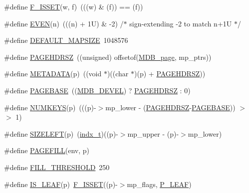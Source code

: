 \begin{DoxyCompactItemize}
\#define \mbox{\hyperlink{group__internal_gaa5b968981dd75e8bf30b40b9bf7bc4b8}{F\+\_\+\+I\+S\+S\+ET}}(w,  f)~(((w) \& (f)) == (f))
\item 
\#define \mbox{\hyperlink{group__internal_gaa714d529ede8765c6f6fffe5293b3bd4}{E\+V\+EN}}(n)~(((n) + 1\+U) \& -\/2) /$\ast$ sign-\/extending -\/2 to match n+1\+U $\ast$/
\item 
\#define \mbox{\hyperlink{group__internal_ga506f893519db205966f7988c03c920f5}{D\+E\+F\+A\+U\+L\+T\+\_\+\+M\+A\+P\+S\+I\+ZE}}~1048576
\item 
\#define \mbox{\hyperlink{group__internal_gae25bcf0c0c5c5ead27e82543cbce02e1}{P\+A\+G\+E\+H\+D\+R\+SZ}}~((unsigned) offsetof(\mbox{\hyperlink{struct_m_d_b__page}{M\+D\+B\+\_\+page}}, mp\+\_\+ptrs))
\item 
\#define \mbox{\hyperlink{group__internal_ga344d0fdca4b5892aba67035a1f9d50e5}{M\+E\+T\+A\+D\+A\+TA}}(p)~((void $\ast$)((char $\ast$)(p) + \mbox{\hyperlink{group__internal_gae25bcf0c0c5c5ead27e82543cbce02e1}{P\+A\+G\+E\+H\+D\+R\+SZ}}))
\item 
\#define \mbox{\hyperlink{group__internal_ga42d35f5d5bf3f161dc064ac7f78a2838}{P\+A\+G\+E\+B\+A\+SE}}~((\mbox{\hyperlink{group__compat_ga103b045068a1d21bf2347a7342f8f486}{M\+D\+B\+\_\+\+D\+E\+V\+EL}}) ? \mbox{\hyperlink{group__internal_gae25bcf0c0c5c5ead27e82543cbce02e1}{P\+A\+G\+E\+H\+D\+R\+SZ}} \+: 0)
\item 
\#define \mbox{\hyperlink{group__internal_ga7c4518ae24926f5f96d70a97c14fcad8}{N\+U\+M\+K\+E\+YS}}(p)~(((p)-\/$>$mp\+\_\+lower -\/ (\mbox{\hyperlink{group__internal_gae25bcf0c0c5c5ead27e82543cbce02e1}{P\+A\+G\+E\+H\+D\+R\+SZ}}-\/\mbox{\hyperlink{group__internal_ga42d35f5d5bf3f161dc064ac7f78a2838}{P\+A\+G\+E\+B\+A\+SE}})) $>$$>$ 1)
\item 
\#define \mbox{\hyperlink{group__internal_gadec51e874501c53388b820f27a937654}{S\+I\+Z\+E\+L\+E\+FT}}(p)~(\mbox{\hyperlink{group__internal_ga730e17f748208d77496ebd895c8375dc}{indx\+\_\+t}})((p)-\/$>$mp\+\_\+upper -\/ (p)-\/$>$mp\+\_\+lower)
\item 
\#define \mbox{\hyperlink{group__internal_ga5c5f96738000941699ea8118631b2792}{P\+A\+G\+E\+F\+I\+LL}}(env,  p)
\item 
\#define \mbox{\hyperlink{group__internal_ga634dcc0977fa832bc40237db6d829597}{F\+I\+L\+L\+\_\+\+T\+H\+R\+E\+S\+H\+O\+LD}}~250
\item 
\#define \mbox{\hyperlink{group__internal_gac047007d585883bfc8cbc82e9a7f041a}{I\+S\+\_\+\+L\+E\+AF}}(p)~\mbox{\hyperlink{group__internal_gaa5b968981dd75e8bf30b40b9bf7bc4b8}{F\+\_\+\+I\+S\+S\+ET}}((p)-\/$>$mp\+\_\+flags, \mbox{\hyperlink{group__mdb__page_gac85fb59a9a2eda0d33e58b23a7ca019a}{P\+\_\+\+L\+E\+AF}})
$$
\end{DoxyCompactItemize}
